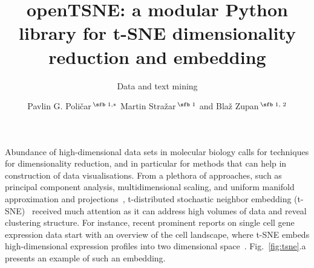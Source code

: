 \documentclass{bioinfo}
\begin{document}

\subtitle{Data and text mining}

\title[openTSNE: a modular Python library for t-SNE dimensionality reduction and embedding]{openTSNE: a modular Python library for t-SNE dimensionality reduction and embedding}
\author[Poli\v{c}ar \textit{et~al}.]{
  Pavlin G. Poli\v{c}ar\,$^{\text{\sfb 1,}*}$
  Martin Stra\v{z}ar\,$^{\text{\sfb 1}}$
  and
  Bla\v{z} Zupan\,$^{\text{\sfb 1, 2}}$}
\address{
$^{\text{\sf 1}}$Faculty of Computer and Information Science, University of Ljubljana, SI-1000 Ljubljana, Slovenia, \\
$^{\text{\sf 2}}$Department of Molecular and Human Genetics, Baylor College of Medicine, Houston TX 77030, U.S.A.
}





\maketitle

Abundance of high-dimensional data sets in molecular biology calls for techniques for dimensionality reduction, and in particular for methods that can help in construction of data visualisations. From a plethora of approaches, such as principal component analysis, multidimensional scaling, and uniform manifold approximation and projections~\citep{}, t-distributed stochastic neighbor embedding (t-SNE)~\citep{tsne,review-tsne} received much attention as it can address high volumes of data and reveal clustering structure. For instance, recent prominent reports on single cell gene expression data start with an overview of the cell landscape, where t-SNE embeds high-dimensional expression profiles into two dimensional space~\citep{Macosko2015,Shekhar2016,three}. Fig.~\ref{fig:tsne}.a presents an example of such an embedding.
\end{document}

